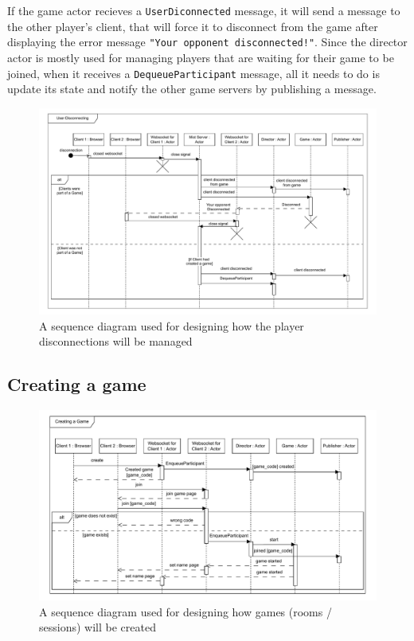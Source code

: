 \documentclass[]{final}
\begin{document}
\newpage

If the game actor recieves a \lstinline|UserDiconnected|
message, it will send a message to the other player's client, that will force it to disconnect
from the game after displaying the error message \lstinline|"Your opponent disconnected!"|.
Since the director actor is mostly used for managing players that are waiting for
their game to be joined, when it receives a \lstinline|DequeueParticipant| message, all it needs
to do is update its state and notify the other game servers by publishing a message.

\begin{figure}[H]
  \centering
  \includegraphics[width=\linewidth]{sequence_disconnecting}
  \caption{A sequence diagram used for designing how the player disconnections will be managed}
\end{figure}

\newpage

\subsection{Creating a game}

\begin{figure}[H]
  \centering
  \includegraphics[width=\linewidth]{sequence_creating}
  \caption{A sequence diagram used for designing how games (rooms / sessions) will be created}
\end{figure}
\end{document}
